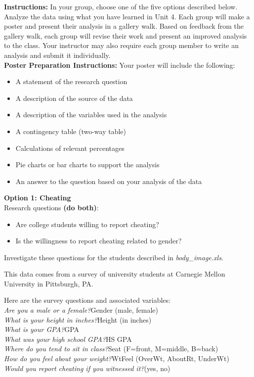 \textbf{Instructions:} In your group, choose one of the five options described below. Analyze the data using what you have learned in Unit 4. Each group will make a poster and present their analysis in a gallery walk. Based on feedback from the gallery walk, each group will revise their work and present an improved analysis to the class. Your instructor may also require each group member to write an analysis and submit it individually.\\ 


\textbf{Poster Preparation Instructions:} Your poster will include the following: 
\begin{itemize}
\item A statement of the research question 
\item A description of the source of the data 
\item A description of the variables used in the analysis 
\item A contingency table (two-way table)
\item Calculations of relevant percentages
\item Pie charts or bar charts to support the analysis
\item An answer to the question based on your analysis of the data
\end{itemize}

\textbf{Option 1: Cheating}\\
Research questions \textbf{(do both)}:
\begin{itemize}
\item Are college students willing to report cheating?
\item Is the willingness to report cheating related to gender?
\end{itemize}

Investigate these questions for the students described in \emph{body\_image.xls}. 

This data comes from a survey of university students at Carnegie Mellon University in Pittsburgh, PA.

Here are the survey questions and associated variables: \\
\emph{Are you a male or a female?}\quad Gender (male, female)\\
\emph{What is your height in inches?}\quad Height (in inches)\\
\emph{What is your GPA?}\quad GPA\\
\emph{What was your high school GPA?}\quad HS GPA\\
\emph{Where do you tend to sit in class?}\quad Seat (F=front, M=middle, B=back)\\
\emph{How do you feel about your weight?}\quad WtFeel (OverWt, AboutRt, UnderWt)\\
\emph{Would you report cheating if you witnessed it?}\quad (yes, no)\\

